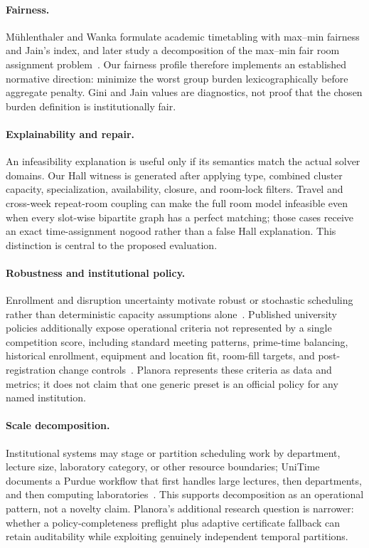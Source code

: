\paragraph{Fairness.}
M\"uhlenthaler and Wanka formulate academic timetabling with max--min fairness and Jain's index, and later study a decomposition of the max--min fair room assignment problem~\cite{muhlenthaler2013fairness,muhlenthaler2013decomposition}.
Our fairness profile therefore implements an established normative direction: minimize the worst group burden lexicographically before aggregate penalty.
Gini and Jain values are diagnostics, not proof that the chosen burden definition is institutionally fair.

\paragraph{Explainability and repair.}
An infeasibility explanation is useful only if its semantics match the actual solver domains.
Our Hall witness is generated after applying type, combined cluster capacity, specialization, availability, closure, and room-lock filters.
Travel and cross-week repeat-room coupling can make the full room model infeasible even when every slot-wise bipartite graph has a perfect matching; those cases receive an exact time-assignment nogood rather than a false Hall explanation.
This distinction is central to the proposed evaluation.

\paragraph{Robustness and institutional policy.}
Enrollment and disruption uncertainty motivate robust or stochastic scheduling rather than deterministic capacity assumptions alone~\cite{holm2023robust}.
Published university policies additionally expose operational criteria not represented by a single competition score, including standard meeting patterns, prime-time balancing, historical enrollment, equipment and location fit, room-fill targets, and post-registration change controls~\cite{ucdavispolicy,berkeleypolicy,michiganpolicy}.
Planora represents these criteria as data and metrics; it does not claim that one generic preset is an official policy for any named institution.

\paragraph{Scale decomposition.}
Institutional systems may stage or partition scheduling work by department, lecture size, laboratory category, or other resource boundaries; UniTime documents a Purdue workflow that first handles large lectures, then departments, and then computing laboratories~\cite{unitimeproblem}.
This supports decomposition as an operational pattern, not a novelty claim.
Planora's additional research question is narrower: whether a policy-completeness preflight plus adaptive certificate fallback can retain auditability while exploiting genuinely independent temporal partitions.
